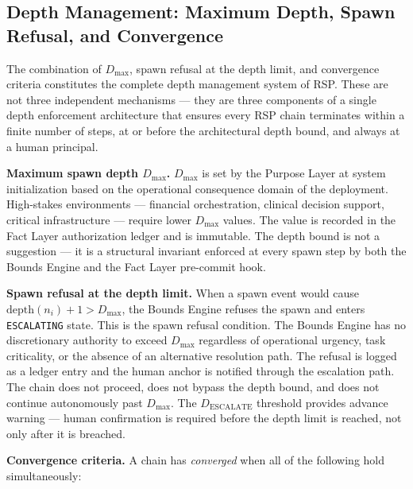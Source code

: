 \subsection{Depth Management: Maximum Depth, Spawn Refusal, and Convergence}

The combination of $D_{\max}$, spawn refusal at the depth limit, and convergence criteria constitutes the complete depth management system of RSP. These are not three independent mechanisms — they are three components of a single depth enforcement architecture that ensures every RSP chain terminates within a finite number of steps, at or before the architectural depth bound, and always at a human principal.

\medskip
\noindent\textbf{Maximum spawn depth $D_{\max}$.} $D_{\max}$ is set by the Purpose Layer at system initialization based on the operational consequence domain of the deployment. High-stakes environments — financial orchestration, clinical decision support, critical infrastructure — require lower $D_{\max}$ values. The value is recorded in the Fact Layer authorization ledger and is immutable. The depth bound is not a suggestion — it is a structural invariant enforced at every spawn step by both the Bounds Engine and the Fact Layer pre-commit hook.

\medskip
\noindent\textbf{Spawn refusal at the depth limit.} When a spawn event would cause $\text{depth}(n_i) + 1 > D_{\max}$, the Bounds Engine refuses the spawn and enters \texttt{ESCALATING} state. This is the spawn refusal condition. The Bounds Engine has no discretionary authority to exceed $D_{\max}$ regardless of operational urgency, task criticality, or the absence of an alternative resolution path. The refusal is logged as a ledger entry and the human anchor is notified through the escalation path. The chain does not proceed, does not bypass the depth bound, and does not continue autonomously past $D_{\max}$. The $D_{\text{ESCALATE}}$ threshold provides advance warning — human confirmation is required before the depth limit is reached, not only after it is breached.

\medskip
\noindent\textbf{Convergence criteria.} A chain has \emph{converged} when all of the following hold simultaneously:

